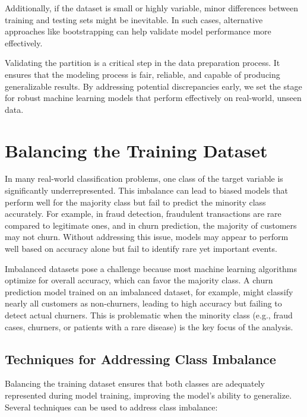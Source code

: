 \documentclass[
  11pt,
]{book}
\theoremstyle{definition}
\theoremstyle{definition}
\theoremstyle{definition}
\theoremstyle{definition}
\theoremstyle{remark}
\begin{document}
Additionally, if the dataset is small or highly variable, minor differences between training and testing sets might be inevitable. In such cases, alternative approaches like bootstrapping can help validate model performance more effectively.

Validating the partition is a critical step in the data preparation process. It ensures that the modeling process is fair, reliable, and capable of producing generalizable results. By addressing potential discrepancies early, we set the stage for robust machine learning models that perform effectively on real-world, unseen data.

\section{Balancing the Training Dataset}\label{balancing-the-training-dataset}

In many real-world classification problems, one class of the target variable is significantly underrepresented. This imbalance can lead to biased models that perform well for the majority class but fail to predict the minority class accurately. For example, in fraud detection, fraudulent transactions are rare compared to legitimate ones, and in churn prediction, the majority of customers may not churn. Without addressing this issue, models may appear to perform well based on accuracy alone but fail to identify rare yet important events.

Imbalanced datasets pose a challenge because most machine learning algorithms optimize for overall accuracy, which can favor the majority class. A churn prediction model trained on an imbalanced dataset, for example, might classify nearly all customers as non-churners, leading to high accuracy but failing to detect actual churners. This is problematic when the minority class (e.g., fraud cases, churners, or patients with a rare disease) is the key focus of the analysis.

\subsection*{Techniques for Addressing Class Imbalance}\label{techniques-for-addressing-class-imbalance}


Balancing the training dataset ensures that both classes are adequately represented during model training, improving the model's ability to generalize. Several techniques can be used to address class imbalance:
\end{document}
